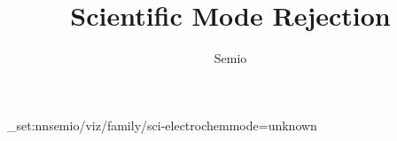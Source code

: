 \documentclass[type=paper,language=en,theme=light]{semio}
\title{Scientific Mode Rejection}
\author{Semio}
\date{}
\begin{document}
\SemioVizProbePage
\ExplSyntaxOn\keys_set:nn{semio/viz/family/sci-electrochem}{mode=unknown}\ExplSyntaxOff
{}
\SemioVizProbeEnd
\end{document}
